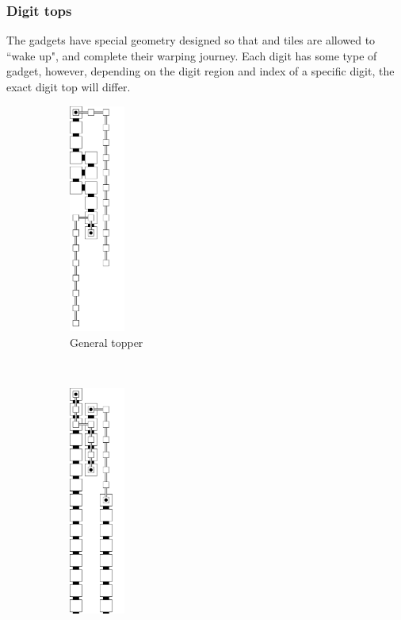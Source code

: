 \subsubsection{Digit tops}
The {\dtop} gadgets have special geometry designed so that {\firstwarp} and
{\secondwarp} tiles are allowed to ``wake up", and complete their warping journey. Each
digit has some type of {\dtop} gadget, however, depending on the digit region
and index of a specific digit, the exact digit top will differ.


\vspace{.5cm}


\begin{figure}[H]
    \centering
    \begin{subfigure}[t]{0.2\textwidth}
        \centering
        \includegraphics[width=0.2\textwidth]{digit_top_general_topper}
        \caption{\label{fig:topper_gen} General topper}
    \end{subfigure}%
    ~
    \begin{subfigure}[t]{0.2\textwidth}
        \centering
        \includegraphics[width=0.2\textwidth]{digit_top_case1_digit1_topper}

\end{subfigure}
\end{figure}
